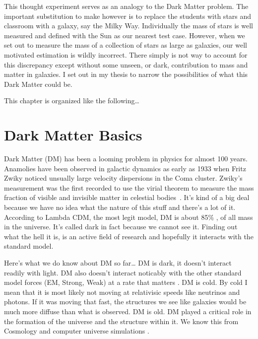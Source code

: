 This thought experiment serves as an analogy to the Dark Matter problem.
The important substitution to make however is to replace the students with stars and classroom with a galaxy, say the Milky Way.
Individually the mass of stars is well measured and defined with the Sun as our nearest test case.
However, when we set out to measure the mass of a collection of stars as large as galaxies, our well motivated estimation is wildly incorrect.
There simply is not way to account for this discrepancy except without some unseen, or dark, contribution to mass and matter in galaxies.
I set out in my thesis to narrow the possibilities of what this Dark Matter could be.

This chapter is organized like the following\dots
{}

\section{Dark Matter Basics\label{sec:basicDM}}

Dark Matter (DM) has been a looming problem in physics for almost 100 years.
Anamolies have been observed in galactic dynamics as early as 1933 when Fritz Zwiky noticed unsually large velocity dispersions in the Coma cluster.
Zwiky's measurement was the first recorded to use the virial theorem to measure the mass fraction of visible and invisible matter in celestial bodies~\cite{Hooper:DMHistory}.
It's kind of a big deal because we have no idea what the nature of this stuff and there's a lot of it.
According to Lambda CDM, the most legit model, \ns DM is about 85\% \fu, of all mass in the universe.
It's called dark in fact because we cannot see it. \ns
Finding out what the hell it is, is an active field of research and hopefully it interacts with the standard model.

Here's what we do know about DM so far\dots
DM is dark, it doesn't interact readily with light.
DM also doesn't interact noticably with the other standard model forces (EM, Strong, Weak) at a rate that matters \ns.
DM is cold.
By cold I mean that it is most likely not moving at relativisic speeds like neutrinos and photons. \ns
If it was moving that fast, the structures we see like galaxies would be much more diffuse than what is observed. \ns
DM is old.
DM played a critical role in the formation of the universe and the structure within it. \ns
We know this from Cosmology and computer universe simulations \ns.

